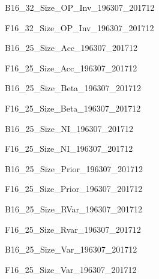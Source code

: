 \begin{landscape}
{B16_32_Size_OP_Inv_196307_201712}
\end{landscape}

\begin{landscape}
{F16_32_Size_OP_Inv_196307_201712}
\end{landscape}

{B16_25_Size_Acc_196307_201712}

{F16_25_Size_Acc_196307_201712}

{B16_25_Size_Beta_196307_201712}

{F16_25_Size_Beta_196307_201712}

{B16_25_Size_NI_196307_201712}

{F16_25_Size_NI_196307_201712}

{B16_25_Size_Prior_196307_201712}

{F16_25_Size_Prior_196307_201712}

{B16_25_Size_RVar_196307_201712}

{F16_25_Size_Rvar_196307_201712}

{B16_25_Size_Var_196307_201712}

{F16_25_Size_Var_196307_201712}